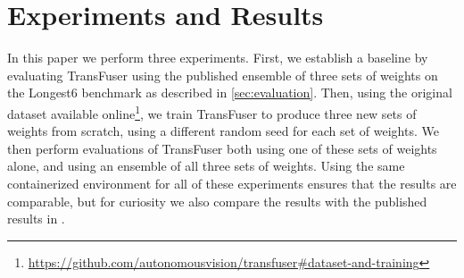 \chapter{Experiments and Results}
\label{chap:results}



In this paper we perform three experiments.
First, we establish a baseline 
by evaluating TransFuser using the published ensemble of three sets of weights on the Longest6 benchmark
as described in \cref{sec:evaluation}.
Then, using the original dataset available online\footnote{\url{https://github.com/autonomousvision/transfuser\#dataset-and-training}},
we train TransFuser to produce three new sets of weights from scratch,
using a different random seed for each set of weights.
We then perform evaluations of TransFuser
both using one of these sets of weights alone,
and using an ensemble of all three sets of weights.
Using the same containerized environment for all of these experiments ensures that the results are comparable,
but for curiosity we also compare the results with the published results in \cite{transfuser-pami}.

